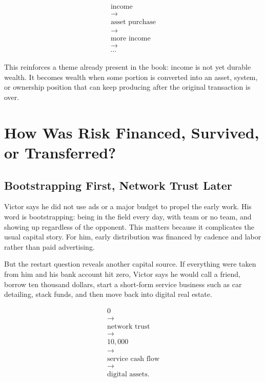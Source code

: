 \documentclass[11pt,oneside]{book}
\begin{document}
\begin{equation}
\begin{gathered}
\text{income}\\
\longrightarrow\\
\text{asset purchase}\\
\longrightarrow\\
\text{more income}\\
\longrightarrow\\
\cdots
\end{gathered}
\end{equation}

This reinforces a theme already present in the book: income is not yet durable wealth. It becomes wealth when some portion is converted into an asset, system, or ownership position that can keep producing after the original transaction is over.

\chapter{How Was Risk Financed, Survived, or Transferred?}

\section{Bootstrapping First, Network Trust Later}

Victor says he did not use ads or a major budget to propel the early work. His word is bootstrapping: being in the field every day, with team or no team, and showing up regardless of the opponent. This matters because it complicates the usual capital story. For him, early distribution was financed by cadence and labor rather than paid advertising.

But the restart question reveals another capital source. If everything were taken from him and his bank account hit zero, Victor says he would call a friend, borrow ten thousand dollars, start a short-form service business such as car detailing, stack funds, and then move back into digital real estate.

\begin{equation}
\begin{gathered}
0\\
\longrightarrow\\
\text{network trust}\\
\longrightarrow\\
10{,}000\\
\longrightarrow\\
\text{service cash flow}\\
\longrightarrow\\
\text{digital assets}.
\end{gathered}
\end{equation}
\end{document}
